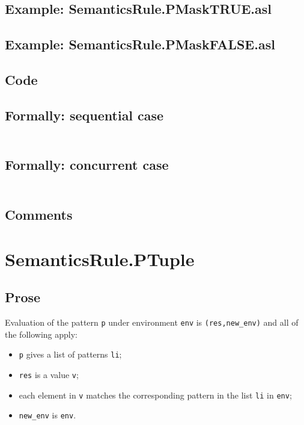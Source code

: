 \documentclass{book}
\begin{document}
    \subsection{Example: SemanticsRule.PMaskTRUE.asl}

    \subsection{Example: SemanticsRule.PMaskFALSE.asl}

  \subsection{Code}

  \subsection{Formally: sequential case}
  \begin{align}
  \end{align} 

  \subsection{Formally: concurrent case}
  \begin{align}
  \end{align} 

    \subsection{Comments}

\section{SemanticsRule.PTuple \label{sec:SemanticsRule.}}

    \subsection{Prose}
   Evaluation of the pattern \texttt{p} under environment \texttt{env} is
  \texttt{(res,new\_env)} and all of the following apply: 
    \begin{itemize}
    \item \texttt{p} gives a list of patterns \texttt{li};
    \item \texttt{res} is a value \texttt{v};
    \item each element in \texttt{v} matches the corresponding pattern in the list \texttt{li} in \texttt{env};
    \item \texttt{new\_env} is \texttt{env}.
    \end{itemize}
\end{document}
